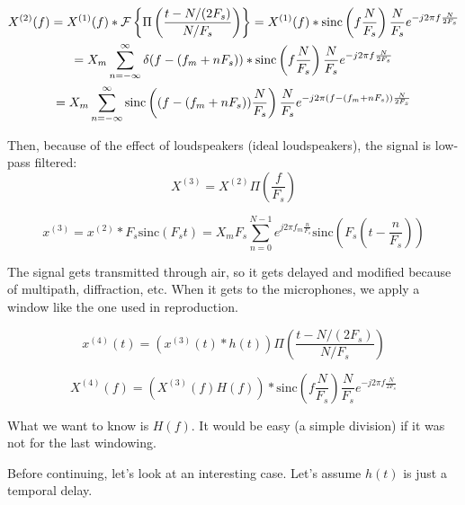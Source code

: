 \begin{multline}
	X^{(2)}(f) = X^{(1)}(f) \ast \FourierTransform{\Pi\left(\frac{t - N/(2 F_s)}{N/F_s}\right)} = X^{(1)}(f) \ast \mathrm{sinc}\left(f\frac{N}{F_s}\right) \frac{N}{F_s} e^{-j 2 \pi f \frac{N}{2 F_s}} \\
	= X_m \sum_{n = -\infty}^{\infty} \delta(f - (f_m + n F_s)) \ast \mathrm{sinc}\left(f\frac{N}{F_s}\right) \frac{N}{F_s} e^{-j 2 \pi f \frac{N}{2 F_s}} \\
	= X_m \sum_{n = -\infty}^{\infty} \mathrm{sinc}\left((f - (f_m + n F_s)) \frac{N}{F_s} \right) \frac{N}{F_s} e^{-j 2 \pi (f - (f_m + n F_s)) \frac{N}{2F_s}}
\end{multline}

Then, because of the effect of loudspeakers (ideal loudspeakers), the signal is low-pass filtered:
\begin{equation}
X^{(3)} = X^{(2)} \Pi\left(\frac{f}{F_s}\right)
\end{equation}

\begin{equation}
x^{(3)} = x^{(2)} \ast F_s \mathrm{sinc} \left(F_s t\right) = X_m F_s \sum_{n = 0}^{N - 1} e^{j 2 \pi f_m \frac{n}{F_s}}
\mathrm{sinc}\left(F_s\left(t - \frac{n}{F_s}\right)\right)
\end{equation}

The signal gets transmitted through air, so it gets delayed and modified because of multipath, diffraction, etc. When it gets to the microphones, we apply a window like the one used in reproduction.

\begin{equation}
x^{(4)}(t) = (x^{(3)}(t) \ast h(t)) \Pi\left(\frac{t - N/(2 F_s)}{N/F_s}\right)
\end{equation}

\begin{equation}
X^{(4)}(f) = (X^{(3)}(f) H(f)) \ast \mathrm{sinc}\left(f\frac{N}{F_s}\right) \frac{N}{F_s} e^{-j 2 \pi f \frac{N}{2 F_s}}
\end{equation}

What we want to know is $H(f)$. It would be easy (a simple division) if it was not for the last windowing.

Before continuing, let's look at an interesting case. Let's assume $h(t)$ is just a temporal delay.